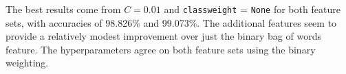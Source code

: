 \documentclass [12 pt] {report}
\begin{document}
\FloatBarrier
The best results come from $C = 0.01$ and \texttt{class\textunderscore weight} = \texttt{None} for both feature sets, with accuracies of 98.826\% and 99.073\%. The additional features seem to provide a relatively modest improvement over just the binary bag of words feature. The hyperparameters agree on both feature sets using the binary weighting.

\vspace*{-2mm}
\end{document}
